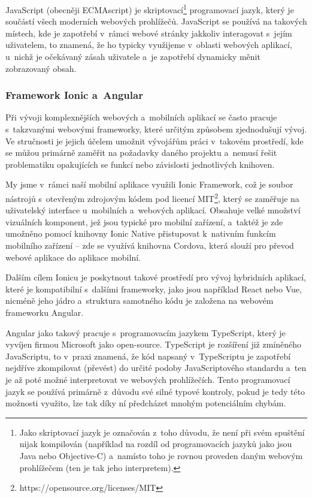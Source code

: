 JavaScript (obecněji ECMAscript) je
skriptovací\footnote{Jako skriptovací jazyk je označován z~toho důvodu, že není při svém spuštění nijak kompilován (například na rozdíl od programovacích jazyků jako jsou Java nebo Objective-C) a~namísto toho je rovnou proveden daným webovým prohlížečem (ten je tak jeho interpretem).}
programovací jazyk, který je součástí všech moderních webových
prohlížečů. JavaScript se používá na takových místech, kde je zapotřebí
v~rámci webové stránky jakkoliv interagovat s~jejím uživatelem, to
znamená, že ho typicky využijeme v~oblasti webových aplikací, u~nichž je
očekávaný zásah uživatele a~je zapotřebí dynamicky měnit zobrazovaný
obsah.~\parencite{javascript}

\hypertarget{framework-ionic-a-angular}{%
\subsubsection{Framework Ionic a~Angular}\label{framework-ionic-a-angular}}

Při vývoji komplexnějších webových a~mobilních aplikací se často pracuje
s~takzvanými webovými frameworky, které určitým způsobem zjednodušují
vývoj. Ve stručnosti je jejich účelem umožnit vývojářům práci v~takovém
prostředí, kde se můžou primárně zaměřit na požadavky daného projektu
a~nemusí řešit problematiku opakujících se funkcí nebo závislosti
jednotlivých knihoven.

My jsme v~rámci naší mobilní aplikace využili Ionic Framework, což je
soubor nástrojů s~otevřeným zdrojovým kódem pod licencí
MIT\footnote{https://opensource.org/licenses/MIT}, který se zaměřuje na
uživatelský interface u~mobilních a~webových aplikací. Obsahuje velké
množství vizuálních komponent, jež jsou typické pro mobilní zařízení,
a~taktéž je zde umožněno pomocí knihovny Ionic Native přistupovat
k~nativním funkcím mobilního zařízení -- zde se využívá knihovna Cordova,
která slouží pro převod webové aplikace do aplikace mobilní.
\parencite{cordova}

Dalším cílem Ionicu je poskytnout takové prostředí pro vývoj hybridních
aplikací, které je kompatibilní s~dalšími frameworky, jako jsou
například React nebo Vue, nicméně jeho jádro a~struktura samotného kódu
je založena na webovém frameworku Angular.~\parencite{ionic}

Angular jako takový pracuje s~programovacím jazykem TypeScript, který je
vyvíjen firmou Microsoft jako open-source. TypeScript je rozšíření již
zmíněného JavaScriptu, to v~praxi znamená, že kód napsaný v~TypeScriptu
je zapotřebí nejdříve zkompilovat (převést) do určité podoby
JavaScriptového standardu a~ten je až poté možné interpretovat ve
webových prohlížečích. Tento programovací jazyk se používá primárně
z~důvodu své silné typové kontroly, pokud je tedy této možnosti využito,
lze tak díky ní předcházet mnohým potenciálním chybám.
\parencite{typescript}

